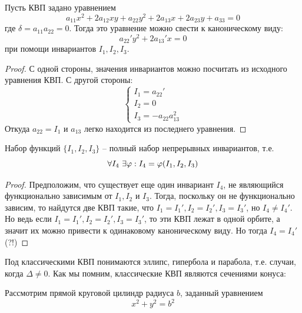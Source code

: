 \begin{Thm}
	Пусть КВП задано уравнением
	\[a_{11} x^2 + 2a_{12}xy + a_{22}y^2 + 2a_{13}x + 2a_{23}y + a_{33} = 0\]
	где $\delta = a_{11} a_{22} = 0$. Тогда это уравнение можно свести к каноническому виду:
	\[a_{22}' y^2 + 2 a_{13}' x = 0\]
	при помощи инвариантов $I_1, I_2, I_3$.
\end{Thm}

\begin{proof}
	С одной стороны, значения инвариантов можно посчитать из исходного уравнения КВП. С другой стороны:
	\[\begin{cases}
		I_1 = a_{22}' \\
		I_2 = 0 \\
		I_3 = -a_{22} a_{13}^2
	\end{cases}\]
	Откуда $a_{22} = I_1$ и $a_{13}$ легко находится из последнего уравнения. 
\end{proof}

\begin{Prop}
	Набор функций $\{I_1, I_2, I_3\}$ -- полный набор непрерывных инвариантов, т.е.
	\[\forall I_4 \ \exists \varphi : I_4 = \varphi(I_1, I_2, I_3)\]
\end{Prop}

\begin{proof}
	Предположим, что существует еще один инвариант $I_4$, не являющийся функционально зависимым от $I_1, I_2$ и $I_3$.
	Тогда, поскольку он не функционально зависим, то найдутся две КВП такие, что $I_1 = I_1', I_2 = I_2', I_3 = I_3'$, но $I_4 \neq I_4'$.
	Но ведь если $I_1 = I_1', I_2 = I_2', I_3 = I_3'$, то эти КВП лежат в одной орбите, а значит их можно привести к одинаковому каноническому виду.
	Но тогда $I_4 = I_4'$ (?!)
\end{proof}


Под классическими КВП понимаются эллипс, гипербола и парабола, т.е. случаи, когда $\Delta \neq 0$.
Как мы помним, классические КВП являются сечениями конуса:

\begin{figure}[H]
	\centering
	\def\svgwidth{.3\columnwidth}
	
\end{figure}

Рассмотрим прямой круговой цилиндр радиуса $b$, заданный уравнением
\[x^2 + y^2 = b^2\] 

\begin{figure}[h]
	\centering
	\def\svgwidth{.8\columnwidth}
	
\end{figure}

